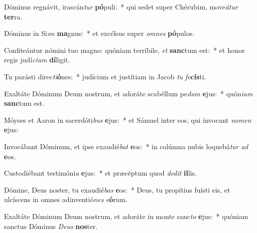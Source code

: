 \item Dóminus regnávit, irascán\textit{tur} \textbf{pó}puli:~* qui sedet super Chérubim, move\textit{á}\textit{tur} \textbf{ter}ra.
\item Dóminus in Si\textit{on} \textbf{ma}gnus:~* et excélsus super \textit{om}\textit{nes} \textbf{pó}pulos.
\item Confiteántur nómini tuo magno: quóniam terríbile, \textit{et} \textbf{sanc}tum est:~* et honor regis judí\textit{ci}\textit{um} \textbf{dí}ligit.
\item Tu parásti direc\textit{ti}\textbf{ó}nes:~* judícium et justítiam in Jacob \textit{tu} \textit{fe}\textbf{cís}ti.
\item Exaltáte Dóminum Deum nostrum, et adoráte scabéllum pe\textit{dum} \textbf{e}jus:~* quón\textit{i}\textit{am} \textbf{sanc}tum est.
\item Móyses et Aaron in sacerdóti\textit{bus} \textbf{e}jus:~* et Sámuel inter eos, qui ínvocant \textit{no}\textit{men} \textbf{e}jus:
\item Invocábant Dóminum, et ipse exaudié\textit{bat} \textbf{e}os:~* in colúmna nubis loquebá\textit{tur} \textit{ad} \textbf{e}os.
\item Custodiébant testimóni\textit{a} \textbf{e}jus:~* et præcéptum quod \textit{de}\textit{dit} \textbf{il}lis.
\item Dómine, Deus noster, tu exaudié\textit{bas} \textbf{e}os:~* Deus, tu propítius fuísti eis, et ulcíscens in omnes adinventió\textit{nes} \textit{e}\textbf{ó}rum.
\item Exaltáte Dóminum Deum nostrum, et adoráte in monte sanc\textit{to} \textbf{e}jus:~* quóniam sanctus Dóminus \textit{De}\textit{us} \textbf{nos}ter.
